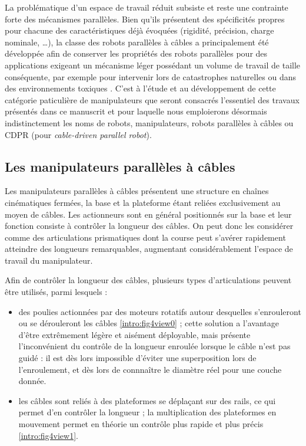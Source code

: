La problématique d'un espace de travail réduit subsiste et reste une contrainte forte des mécanismes parallèles. Bien qu'ils présentent des spécificités propres pour chacune des caractéristiques déjà évoquées (rigidité, précision, charge nominale, \dots), la classe des robots parallèles à câbles a principalement été développée afin de conserver les propriétés des robots parallèles pour des applications exigeant un mécanisme léger possédant un volume de travail de taille conséquente, par exemple pour intervenir lors de catastrophes naturelles ou dans des environnements toxiques \cite{1992:Albus.Bostelman.ea}. C'est à l'étude et au développement de cette catégorie paticulière de manipulateurs que seront consacrés l'essentiel des travaux présentés dans ce manuscrit et pour laquelle nous emploierons désormais indistinctement les noms de robots, manipulateurs, robots parallèles à câbles ou CDPR (pour {\it cable-driven parallel robot}).

\subsection{Les manipulateurs parallèles à câbles}

Les manipulateurs parallèles à câbles présentent une structure en chaînes cinéma\-tiques fermées, la base et la plateforme étant reliées exclusivement au moyen de câbles. Les actionneurs sont en général positionnés sur la base et leur fonction consiste à contrôler la longueur des câbles. On peut donc les considérer comme des articulations prismatiques dont la course peut s'avérer rapidement atteindre des longueurs remarquables, augmentant considérablement l'espace de travail du manipulateur.

Afin de contrôler la longueur des câbles, plusieurs types d'articulations peuvent être utilisés, parmi lesquels :
\begin{itemize}
 \item des poulies actionnées par des moteurs rotatifs autour desquelles s'enrou\-leront ou se dérouleront les câbles \ref{intro:fig4view0} ; cette solution a l'avantage d'être extrêmement légère et aisément déployable, mais présente l'inconvénient du contrôle de la longueur enroulée lorsque le câble n'est pas guidé : il est dès lors impossible d'éviter une superposition lors de l'enroulement, et dès lors de connnaître le diamètre réel pour une couche donnée.
 \item les câbles sont reliés à des plateformes se déplaçant sur des rails, ce qui permet d'en contrôler la longueur \cite{merlet2008} ; la multiplication des plateformes en mouvement permet en théorie un contrôle plus rapide et plus précis \ref{intro:fig4view1}. 
\end{itemize}

